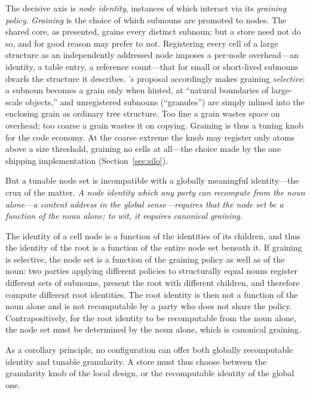 \documentclass[twoside]{article}
\begin{document}
The decisive axis is \emph{node identity}, instances of which interact via its \emph{graining policy}.  \emph{Graining} is the choice of which subnouns are promoted to nodes.  The shared core, as presented, grains every distinct subnoun; but a store need not do so, and for good reason may prefer to not.  Registering every cell of a large structure as an independently addressed node imposes a per-node overhead---an identity, a table entry, a reference count---that for small or short-lived subnouns dwarfs the structure it describes.  's proposal accordingly makes graining \emph{selective}:  a subnoun becomes a grain only when hinted, at ``natural boundaries of large-scale objects,'' and unregistered subnouns (``granules'') are simply inlined into the enclosing grain as ordinary tree structure.  Too fine a grain wastes space on overhead; too coarse a grain wastes it on copying.  Graining is thus a tuning knob for the code economy.  At the coarse extreme the knob may register only atoms above a size threshold, graining no cells at all---the choice made by the one shipping implementation (Section~\ref{sec:silo}).

But a tunable node set is incompatible with a globally meaningful identity---the crux of the matter.  \emph{A node identity which any party can recompute from the noun alone---a content address in the global sense---requires that the node set be a function of the noun alone; to wit, it requires canonical graining.}

The identity of a cell node is a function of the identities of its children, and thus the identity of the root is a function of the entire node set beneath it.  If graining is selective, the node set is a function of the graining policy as well as of the noun:  two parties applying different policies to structurally equal nouns register different sets of subnouns, present the root with different children, and therefore compute different root identities.  The root identity is then not a function of the noun alone and is not recomputable by a party who does not share the policy.  Contrapositively, for the root identity to be recomputable from the noun alone, the node set must be determined by the noun alone, which is canonical graining.

As a corollary principle, no configuration can offer both globally recomputable identity and tunable granularity.  A store must thus choose between the granularity knob of the local design, or the recomputable identity of the global one.
\end{document}
